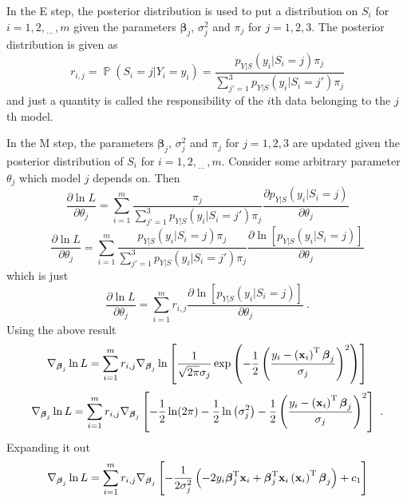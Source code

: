 \documentclass[12pt]{report}
\DeclareMathOperator{\prob}{\mathbb{P}}
\newcommand{\T}{^\textup{T}}
\newcommand{\dotdotdot}{_{\phantom{.}\cdots}}
\newcommand{\vect}[1]{\mathbf{#1}}
\newcommand{\vectGreek}[1]{\boldsymbol{#1}}
\begin{document}
In the E step, the posterior distribution is used to put a distribution on $S_i$ for $i=1,2,\dotdotdot,m$ given the parameters $\vectGreek{\beta}_j$, $\sigma_j^2$ and $\pi_j$ for $j=1,2,3$. The posterior distribution is given as
\begin{equation}
r_{i,j}=\prob\left(S_i=j|Y_i=y_i\right)=\frac
{p_{Y|S}\left(y_i|S_i=j\right)\pi_j}
{\sum_{j'=1}^3p_{Y|S}\left(y_i|S_i=j'\right)\pi_j}
\end{equation}
and just a quantity is called the responsibility of the $i$th data belonging to the $j$th model.

In the M step, the parameters $\vectGreek{\beta}_j$, $\sigma_j^2$ and $\pi_j$ for $j=1,2,3$ are updated given the posterior distribution of $S_i$ for $i=1,2,\dotdotdot,m$. Consider some arbitrary parameter $\theta_j$ which model $j$ depends on. Then
\begin{equation}
\frac{\partial\ln{L}}{\partial\theta_j}=
\sum_{i=1}^m\frac{\pi_j}{\sum_{j'=1}^3p_{Y|S}\left(y_i|S_i=j'\right)\pi_j}
\frac{\partial p_{Y|S}\left(y_i|S_i=j\right)}{\partial\theta_j}
\end{equation}
\begin{equation}
\frac{\partial\ln{L}}{\partial\theta_j}=
\sum_{i=1}^m\frac{p_{Y|S}\left(y_i|S_i=j\right)\pi_j}{\sum_{j'=1}^3p_{Y|S}\left(y_i|S_i=j'\right)\pi_j}
\frac{\partial \ln\left[p_{Y|S}\left(y_i|S_i=j\right)\right]}{\partial\theta_j}
\end{equation}
which is just
\begin{equation}
\frac{\partial\ln{L}}{\partial\theta_j}=
\sum_{i=1}^mr_{i,j}
\frac{\partial \ln\left[p_{Y|S}\left(y_i|S_i=j\right)\right]}{\partial\theta_j} \ .
\end{equation}
Using the above result
\begin{equation}
\nabla_{\vectGreek{\beta}_j}\ln{L}
=\sum_{i=1}^{m}
r_{i,j}
\nabla_{\vectGreek{\beta}_j}
\ln\left[
	\frac{1}{\sqrt{2\pi}\sigma_j}\exp\left(-\frac{1}{2}\left(\frac{y_i-\left(\vect{x}_i\right)\T\vectGreek{\beta}_j}{\sigma_j}\right)^2\right)
\right]
\end{equation}
\begin{equation}
\nabla_{\vectGreek{\beta}_j}\ln{L}
=\sum_{i=1}^{m}
r_{i,j}
\nabla_{\vectGreek{\beta}_j}
\left[
	-\frac{1}{2}\ln(2\pi) - \frac{1}{2}\ln\left(\sigma_j^2\right)-\frac{1}{2}\left(\frac{y_i-\left(\vect{x}_i\right)\T\vectGreek{\beta}_j}{\sigma_j}\right)^2
\right] \ .
\end{equation}
Expanding it out
\begin{equation}
\nabla_{\vectGreek{\beta}_j}\ln{L}
=\sum_{i=1}^{m}
r_{i,j}
\nabla_{\vectGreek{\beta}_j}
\left[-\frac{1}{2\sigma_j^2}\left(-2y_i\vectGreek{\beta}_j\T\vect{x}_i
+\vectGreek{\beta}_j\T\vect{x}_i\left(\vect{x}_i\right)\T\vectGreek{\beta}_j
\right)
+c_1
\right]
\end{equation}
\end{document}

